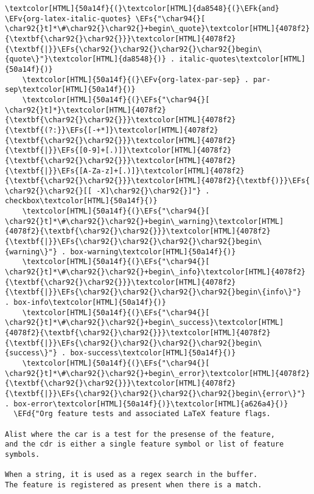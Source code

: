 \documentclass{scrartcl}
\newcommand{\EFk}[1]{\textcolor{EFk}{#1}} %
\newcommand{\EFd}[1]{\textcolor{EFd}{\textit{#1}}} %
\newcommand{\EFs}[1]{\textcolor{EFs}{#1}} %
\newcommand{\EFv}[1]{\textcolor{EFv}{#1}} %
\begin{document}
\begin{enumerate}
\begin{Code}
\begin{Verbatim}[]
    \textcolor[HTML]{50a14f}{(}\textcolor[HTML]{da8548}{(}\EFk{and} \EFv{org-latex-italic-quotes} \EFs{"\char94{}[ \char92{}t]*\#\char92{}\char92{}+begin\_quote}\textcolor[HTML]{4078f2}{\textbf{\char92{}\char92{}}}\textcolor[HTML]{4078f2}{\textbf{|}}\EFs{\char92{}\char92{}\char92{}\char92{}begin\{quote\}"}\textcolor[HTML]{da8548}{)} . italic-quotes\textcolor[HTML]{50a14f}{)}
    \textcolor[HTML]{50a14f}{(}\EFv{org-latex-par-sep} . par-sep\textcolor[HTML]{50a14f}{)}
    \textcolor[HTML]{50a14f}{(}\EFs{"\char94{}[ \char92{}t]*}\textcolor[HTML]{4078f2}{\textbf{\char92{}\char92{}}}\textcolor[HTML]{4078f2}{\textbf{(?:}}\EFs{[-+*]}\textcolor[HTML]{4078f2}{\textbf{\char92{}\char92{}}}\textcolor[HTML]{4078f2}{\textbf{|}}\EFs{[0-9]+[.)]}\textcolor[HTML]{4078f2}{\textbf{\char92{}\char92{}}}\textcolor[HTML]{4078f2}{\textbf{|}}\EFs{[A-Za-z]+[.)]}\textcolor[HTML]{4078f2}{\textbf{\char92{}\char92{}}}\textcolor[HTML]{4078f2}{\textbf{)}}\EFs{ \char92{}\char92{}[[ -X]\char92{}\char92{}]"} . checkbox\textcolor[HTML]{50a14f}{)}
    \textcolor[HTML]{50a14f}{(}\EFs{"\char94{}[ \char92{}t]*\#\char92{}\char92{}+begin\_warning}\textcolor[HTML]{4078f2}{\textbf{\char92{}\char92{}}}\textcolor[HTML]{4078f2}{\textbf{|}}\EFs{\char92{}\char92{}\char92{}\char92{}begin\{warning\}"} . box-warning\textcolor[HTML]{50a14f}{)}
    \textcolor[HTML]{50a14f}{(}\EFs{"\char94{}[ \char92{}t]*\#\char92{}\char92{}+begin\_info}\textcolor[HTML]{4078f2}{\textbf{\char92{}\char92{}}}\textcolor[HTML]{4078f2}{\textbf{|}}\EFs{\char92{}\char92{}\char92{}\char92{}begin\{info\}"}       . box-info\textcolor[HTML]{50a14f}{)}
    \textcolor[HTML]{50a14f}{(}\EFs{"\char94{}[ \char92{}t]*\#\char92{}\char92{}+begin\_success}\textcolor[HTML]{4078f2}{\textbf{\char92{}\char92{}}}\textcolor[HTML]{4078f2}{\textbf{|}}\EFs{\char92{}\char92{}\char92{}\char92{}begin\{success\}"} . box-success\textcolor[HTML]{50a14f}{)}
    \textcolor[HTML]{50a14f}{(}\EFs{"\char94{}[ \char92{}t]*\#\char92{}\char92{}+begin\_error}\textcolor[HTML]{4078f2}{\textbf{\char92{}\char92{}}}\textcolor[HTML]{4078f2}{\textbf{|}}\EFs{\char92{}\char92{}\char92{}\char92{}begin\{error\}"}     . box-error\textcolor[HTML]{50a14f}{)}\textcolor[HTML]{a626a4}{)}
  \EFd{"Org feature tests and associated LaTeX feature flags.

Alist where the car is a test for the presense of the feature,
and the cdr is either a single feature symbol or list of feature symbols.

When a string, it is used as a regex search in the buffer.
The feature is registered as present when there is a match.


\end{Verbatim}
\end{Code}
\end{enumerate}
\end{document}
